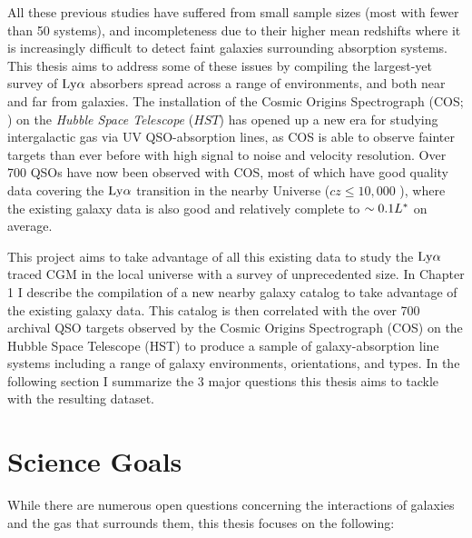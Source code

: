All these previous studies have suffered from small sample sizes (most with fewer than 50 systems), and incompleteness due to their higher mean redshifts where it is increasingly difficult to detect faint galaxies surrounding absorption systems. This thesis aims to address some of these issues by compiling the largest-yet survey of $\rm Ly\alpha$ absorbers spread across a range of environments, and both near and far from galaxies. The installation of the Cosmic Origins Spectrograph (COS; \citealt{green2012}) on the \emph{Hubble Space Telescope} ($HST$) has opened up a new era for studying intergalactic gas via UV QSO-absorption lines, as COS is able to observe fainter targets than ever before with high signal to noise and velocity resolution. Over 700 QSOs have now been observed with COS, most of which have good quality data covering the $\rm Ly\alpha$ transition in the nearby Universe ($cz \leq 10,000$ \kms), where the existing galaxy data is also good and relatively complete to $\sim 0.1 L^{\**}$ on average. 

This project aims to take advantage of all this existing data to study the $\rm Ly\alpha$ traced CGM in the local universe with a survey of unprecedented size. In Chapter 1 I describe the compilation of a new nearby galaxy catalog to take advantage of the existing galaxy data. This catalog is then correlated with the over 700 archival QSO targets observed by the Cosmic Origins Spectrograph (COS) on the Hubble Space Telescope (HST) to produce a sample of galaxy-absorption line systems including a range of galaxy environments, orientations, and types. In the following section I summarize the 3 major questions this thesis aims to tackle with the resulting dataset.





\section{Science Goals}
While there are numerous open questions concerning the interactions of galaxies and the gas that surrounds them, this thesis focuses on the following:


